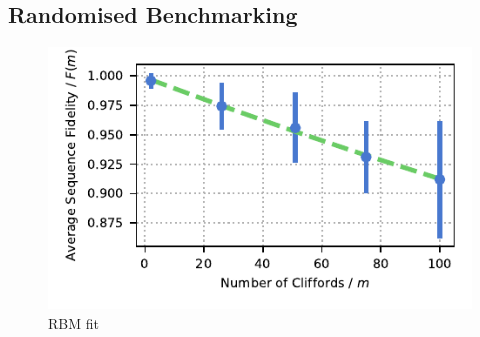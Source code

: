 \subsection{Randomised Benchmarking}
\label{sec:Randomised Benchmarking}

    \begin{figure}
        \begin{center}
        \noindent\includegraphics[width=\linewidth]{
            figures/pdf_figure/rbm_fit.pdf
            }
        \end{center}
        \caption{
            RBM fit
            }
        \label{fig:rbm}
    \end{figure}

